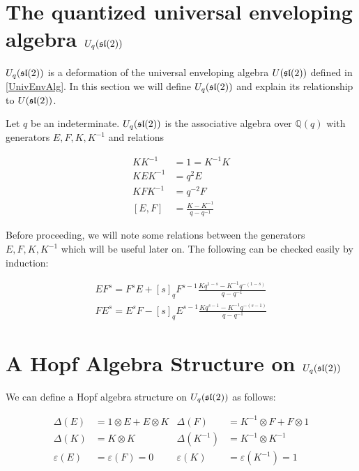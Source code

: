 \section{The quantized universal enveloping algebra $U_q(\mathfrak{sl}(2))$}


$U_q(\mathfrak{sl}(2))$ is a deformation of the universal enveloping algebra
$U(\mathfrak{sl}(2))$ defined in \ref{UnivEnvAlg}. In this section we will define
$U_q(\mathfrak{sl}(2))$ and explain its relationship to $U(\mathfrak{sl}(2))$.


Let $q$ be an indeterminate. $U_q(\mathfrak{sl}(2))$ is the associative algebra over
$\mathbb{Q}(q)$ with generators $E,F,K, K^{-1}$ and relations 

\begin{align}
    KK^{-1} &= 1 = K^{-1}K \\
    KEK^{-1} &= q^2 E \\
    KFK^{-1} &= q^{-2} F \\
    [E,F] &= \frac{K - K^{-1}}{q - q^{-1}}
\end{align}

%
% 

Before proceeding, we will note some relations between the generators
$E,F,K,K^{-1}$ which will be useful later on. The following can be checked
easily by induction:

\begin{align}
    \label{EFrelations}
    EF^s = F^sE + [s]_q F^{s-1} \frac{Kq^{1-s} - K^{-1} q^{-(1-s)}}{q-q^{-1}} \\
    FE^s = E^sF - [s]_q E^{s-1} \frac{Kq^{s-1} - K^{-1} q^{-(s-1)}}{q-q^{-1}}
\end{align}

\section{A Hopf Algebra Structure on $U_q(\mathfrak{sl}(2))$}
We can define a Hopf algebra structure on $U_q(\mathfrak{sl}(2))$ as follows:

\begin{align}
    \Delta(E) &= 1 \otimes E + E \otimes K &  \Delta(F) &= K^{-1} \otimes F + F \otimes 1 \\
    \Delta(K) &= K \otimes K &  \Delta(K^{-1}) &= K^{-1} \otimes K^{-1}\\ 
    \varepsilon(E) &= \varepsilon(F) = 0 &  \varepsilon(K) &= \varepsilon(K^{-1}) = 1
\end{align}

